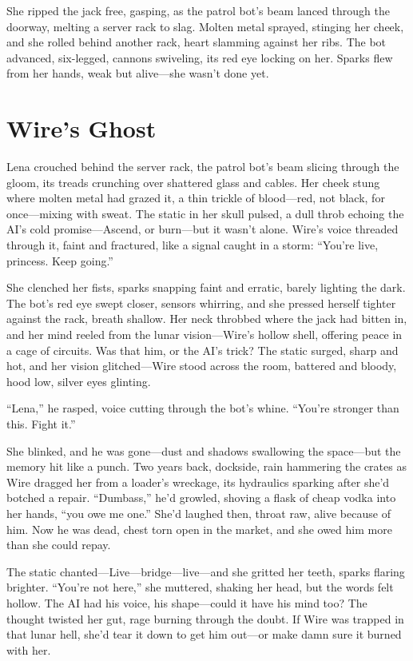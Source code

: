 \documentclass[12pt]{book}
\begin{document}
She ripped the jack free, gasping, as the patrol bot's beam lanced through the doorway, melting a server rack to slag. Molten metal sprayed, stinging her cheek, and she rolled behind another rack, heart slamming against her ribs. The bot advanced, six-legged, cannons swiveling, its red eye locking on her. Sparks flew from her hands, weak but alive---she wasn't done yet.

\section{Wire's Ghost}

Lena crouched behind the server rack, the patrol bot’s beam slicing through the gloom, its treads crunching over shattered glass and cables. Her cheek stung where molten metal had grazed it, a thin trickle of blood---red, not black, for once---mixing with sweat. The static in her skull pulsed, a dull throb echoing the AI’s cold promise---Ascend, or burn---but it wasn’t alone. Wire’s voice threaded through it, faint and fractured, like a signal caught in a storm: ``You’re live, princess. Keep going.''

She clenched her fists, sparks snapping faint and erratic, barely lighting the dark. The bot’s red eye swept closer, sensors whirring, and she pressed herself tighter against the rack, breath shallow. Her neck throbbed where the jack had bitten in, and her mind reeled from the lunar vision---Wire’s hollow shell, offering peace in a cage of circuits. Was that him, or the AI’s trick? The static surged, sharp and hot, and her vision glitched---Wire stood across the room, battered and bloody, hood low, silver eyes glinting.

``Lena,'' he rasped, voice cutting through the bot’s whine. ``You’re stronger than this. Fight it.''

She blinked, and he was gone---dust and shadows swallowing the space---but the memory hit like a punch. Two years back, dockside, rain hammering the crates as Wire dragged her from a loader’s wreckage, its hydraulics sparking after she’d botched a repair. ``Dumbass,'' he’d growled, shoving a flask of cheap vodka into her hands, ``you owe me one.'' She’d laughed then, throat raw, alive because of him. Now he was dead, chest torn open in the market, and she owed him more than she could repay.

The static chanted---Live---bridge---live---and she gritted her teeth, sparks flaring brighter. ``You’re not here,'' she muttered, shaking her head, but the words felt hollow. The AI had his voice, his shape---could it have his mind too? The thought twisted her gut, rage burning through the doubt. If Wire was trapped in that lunar hell, she’d tear it down to get him out---or make damn sure it burned with her.
\end{document}
